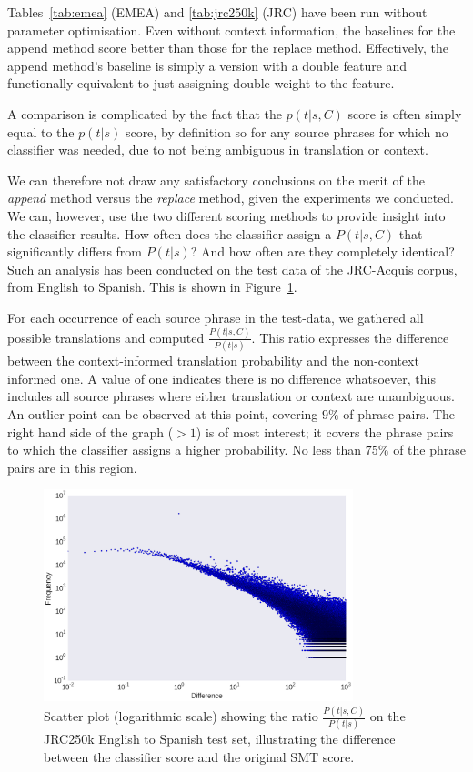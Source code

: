 \documentclass[smallextended]{svjour3}       %
\theoremstyle{break}
\begin{document}
Tables~\ref{tab:emea} (EMEA) and \ref{tab:jrc250k} (JRC) have been run without
parameter optimisation. Even without context information, the baselines for the
append method score better than those for the replace method. Effectively, the
append method's baseline is simply a version with a double feature and
functionally equivalent to just assigning double weight to the feature.

A comparison is complicated by the fact that the $p(t|s,C)$ score is often simply
equal to the $p(t|s)$ score, by definition so for any source phrases for which no
classifier was needed, due to not being ambiguous in translation or context. 

We can therefore not draw any satisfactory conclusions on the merit of the
\emph{append} method versus the \emph{replace} method, given the experiments we
conducted. We can, however, use the two different scoring methods to provide
insight into the classifier results. How often does the classifier assign a
$P(t|s,C)$ that significantly differs from $P(t|s)$? And how often are they
completely identical?  Such an analysis has been conducted on the test data of
the JRC-Acquis corpus, from English to Spanish. This is shown in
Figure~\ref{fig:scoredifference}.

For each occurrence of each source phrase in the test-data, we gathered all
possible translations and computed $\frac{P(t|s,C)}{P(t|s)}$. This ratio
expresses the difference between the context-informed translation probability
and the non-context informed one. A value of one indicates there is no
difference whatsoever, this includes all source phrases where either
translation or context are unambiguous. An outlier point can
be observed at this point, covering $9\%$ of phrase-pairs. The right hand side
of the graph ($>1$) is of most interest; it covers the phrase pairs to which
the classifier assigns a higher probability. No less than $75\%$ of the phrase
pairs are in this region.

\begin{figure}
\begin{center}
\includegraphics[width=90.00mm]{scoredifference.png}
\caption{Scatter plot (logarithmic scale) showing the ratio
$\frac{P(t|s,C)}{P(t|s)}$ on the  JRC250k English to Spanish test set, illustrating the difference between the classifier score and the original SMT score.}
\label{fig:scoredifference}
\end{center}
\end{figure}
\end{document}
